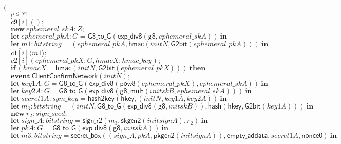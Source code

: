 \documentclass{article}
\newcommand{\cinput}[2]{{#1}({#2})}
\newcommand{\coutput}[2]{\overline{#1}\langle{#2}\rangle}
\newcommand{\kw}[1]{\mathbf{#1}}
\newcommand{\kwf}[1]{\mathsf{#1}}
\newcommand{\var}[1]{\mathit{#1}}
\newcommand{\kwt}[1]{\mathit{#1}}
\newcommand{\kwp}[1]{\mathit{#1}}
\newcommand{\kwc}[1]{\mathit{#1}}
\begin{document}
\begin{tabbing}
\>$($\\
\>$\quad !^{\var{i} \leq \kwp{N1}}$\\
\>$\quad \cinput{\kwc{c9}[\var{i}]}{};$\\
\>$\quad \kw{new}\ \var{ephemeral{\_}skA}: \kwt{Z};$\\
\>$\quad \kw{let}\ \var{ephemeral{\_}pkA}: \kwt{G} = \kwf{G8{\_}to{\_}G}(\kwf{exp{\_}div8}(\kwf{g8}, \var{ephemeral{\_}skA}))\ \kw{in}$\\
\>$\quad \kw{let}\ \var{m1}: \kwt{bitstring} = \kwf{}(\var{ephemeral{\_}pkA}, \kwf{hmac}(\var{initN}, \kwf{G2bit}(\var{ephemeral{\_}pkA})))\ \kw{in}$\\
\>$\quad \coutput{\kwc{c1}[\var{i}]}{\var{m1}};$\\
\>$\quad \cinput{\kwc{c2}[\var{i}]}{\var{ephemeral{\_}pkX}: \kwt{G}, \var{hmacX}: \kwt{hmac{\_}key}};$\\
\>$\quad \kw{if}\ (\var{hmacX}  =  \kwf{hmac}(\var{initN}, \kwf{G2bit}(\var{ephemeral{\_}pkX})))\ \kw{then}$\\
\>$\quad \kw{event}\ \kwf{ClientConfirmNetwork}(\var{initN});$\\
\>$\quad \kw{let}\ \var{key1A}: \kwt{G} = \kwf{G8{\_}to{\_}G}(\kwf{exp{\_}div8}(\kwf{pow8}(\var{ephemeral{\_}pkX}), \var{ephemeral{\_}skA}))\ \kw{in}$\\
\>$\quad \kw{let}\ \var{key2A}: \kwt{G} = \kwf{G8{\_}to{\_}G}(\kwf{exp{\_}div8}(\kwf{g8}, \kwf{mult}(\var{initskB}, \var{ephemeral{\_}skA})))\ \kw{in}$\\
\>$\quad \kw{let}\ \var{secret1A}: \kwt{sym{\_}key} = \kwf{hash2key}(\kwf{hkey}, \kwf{}(\var{initN}, \var{key1A}, \var{key2A}))\ \kw{in}$\\
\>$\quad \kw{let}\ \var{m}_{3}: \kwt{bitstring} = \kwf{}(\var{initN}, \kwf{G8{\_}to{\_}G}(\kwf{exp{\_}div8}(\kwf{g8}, \var{initskB})), \kwf{hash}(\kwf{hkey}, \kwf{G2bit}(\var{key1A})))\ \kw{in}$\\
\>$\quad \kw{new}\ \var{r}_{2}: \kwt{sign{\_}seed};$\\
\>$\quad \kw{let}\ \var{sign{\_}A}: \kwt{bitstring} = \kwf{sign{\_}r2}(\var{m}_{3}, \kwf{skgen2}(\var{initsignA}), \var{r}_{2})\ \kw{in}$\\
\>$\quad \kw{let}\ \var{pkA}: \kwt{G} = \kwf{G8{\_}to{\_}G}(\kwf{exp{\_}div8}(\kwf{g8}, \var{initskA}))\ \kw{in}$\\
\>$\quad \kw{let}\ \var{m3}: \kwt{bitstring} = \kwf{secret{\_}box}(\kwf{}(\var{sign{\_}A}, \var{pkA}, \kwf{pkgen2}(\var{initsignA})), \kwf{empty{\_}addata}, \var{secret1A}, \kwf{nonce0})\ \kw{in}$\\

\end{tabbing}
\end{document}
